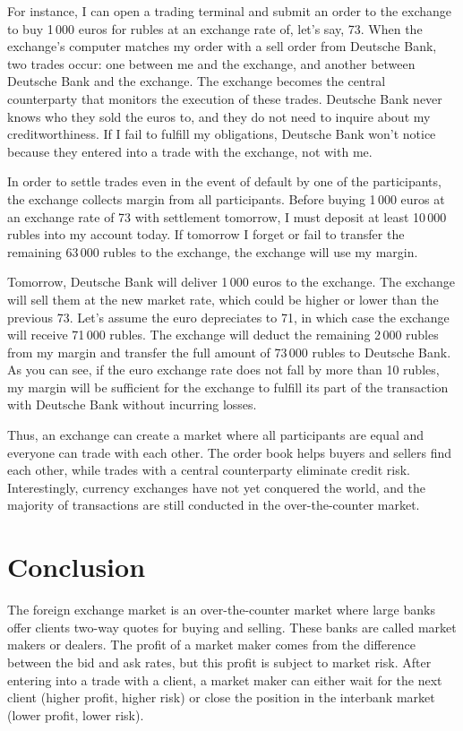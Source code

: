 \documentclass[a4paper,14pt]{extarticle}
\begin{document}
For instance, I can open a trading terminal and submit an order to the exchange 
to buy 1\,000 euros for rubles at an exchange rate of, let's say, 73. When the 
exchange's computer matches my order with a sell order from Deutsche Bank, two 
trades occur: one between me and the exchange, and another between Deutsche Bank 
and the exchange. The exchange becomes the central counterparty that monitors 
the execution of these trades. Deutsche Bank never knows who they sold the 
euros to, and they do not need to inquire about my creditworthiness. If I fail 
to fulfill my obligations, Deutsche Bank won't notice because they entered into 
a trade with the exchange, not with me.

In order to settle trades even in the event of default by one of the 
participants, the exchange collects margin from all participants. Before buying 
1\,000 euros at an exchange rate of 73 with settlement tomorrow, I must deposit 
at least 10\,000 rubles into my account today. If tomorrow I forget or fail to 
transfer the remaining 63\,000 rubles to the exchange, the exchange will use my 
margin.

Tomorrow, Deutsche Bank will deliver 1\,000 euros to the exchange. The exchange 
will sell them at the new market rate, which could be higher or lower than the 
previous 73. Let's assume the euro depreciates to 71, in which case the exchange 
will receive 71\,000 rubles. The exchange will deduct the remaining 2\,000 
rubles from my margin and transfer the full amount of 73\,000 rubles to Deutsche 
Bank. As you can see, if the euro exchange rate does not fall by more than 10 
rubles, my margin will be sufficient for the exchange to fulfill its part of the 
transaction with Deutsche Bank without incurring losses.

Thus, an exchange can create a market where all participants are equal and 
everyone can trade with each other. The order book helps buyers and sellers find 
each other, while trades with a central counterparty eliminate credit risk. 
Interestingly, currency exchanges have not yet conquered the world, and the 
majority of transactions are still conducted in the over-the-counter market.

\section*{Conclusion}

The foreign exchange market is an over-the-counter market where large banks 
offer clients two-way quotes for buying and selling. These banks are called 
market makers or dealers. The profit of a market maker comes from the difference 
between the bid and ask rates, but this profit is subject to market risk. 
After entering into a trade with a client, a market maker can either wait for 
the next client (higher profit, higher risk) or close the position in the 
interbank market (lower profit, lower risk).
\end{document}

